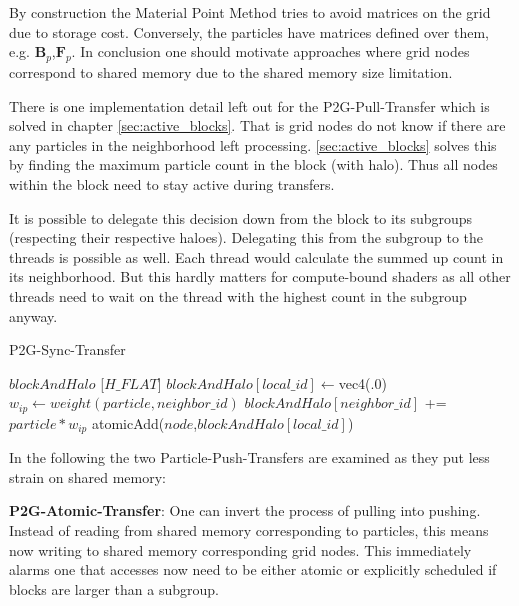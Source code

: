 \documentclass[m,times]{cgMA}
\begin{document}
By construction the Material Point Method tries to avoid matrices on the grid due to storage cost. Conversely, the particles have matrices defined over them, e.g. $\boldsymbol{B}_p$,$\boldsymbol{F}_p$. In conclusion one should motivate approaches where grid nodes correspond to shared memory due to the shared memory size limitation.

There is one implementation detail left out for the P2G-Pull-Transfer which is solved in chapter \ref{sec:active_blocks}. That is grid nodes do not know if there are any particles in the neighborhood left processing. \ref{sec:active_blocks} solves this by finding the maximum particle count in the block (with halo). Thus all nodes within the block need to stay active during transfers.

It is possible to delegate this decision down from the block to its subgroups (respecting their respective haloes). Delegating this from the subgroup to the threads is possible as well. Each thread would calculate the summed up count in its neighborhood. But this hardly matters for compute-bound shaders as all other threads need to wait on the thread with the highest count in the subgroup anyway.

\begin{algorithm}[t]
  \caption{P2G-Sync-Transfer}\label{alg:p2g}
  \begin{algorithmic}[1]
    \State {} $blockAndHalo$ [$H\_FLAT$]
      \State $blockAndHalo[local\_id] \gets $vec4(.0)
      \EndFor
      \State {}
        \label{alg:p2g_dyn_loop}
       
	\State $w_{ip} \gets weight(particle,neighbor\_id)$
	\State $blockAndHalo[neighbor\_id] $ += $ particle*w_{ip}$
	\State {}  \label{alg:p2g_uniform_barrier}
	\EndFor
      \EndFor
      \State atomicAdd($node$,$blockAndHalo[local\_id]$) \label{alg:atomicAdd}
      \EndFor
    \ENDFAP
  \end{algorithmic}
\end{algorithm}

In the following the two Particle-Push-Transfers are examined as they put less strain on shared memory:

\textbf{P2G-Atomic-Transfer}: One can invert the process of pulling into pushing. Instead of reading from shared memory corresponding to particles, this means now writing to shared memory corresponding grid nodes. This immediately alarms one that accesses now need to be either atomic or explicitly scheduled if blocks are larger than a subgroup.
\end{document}
